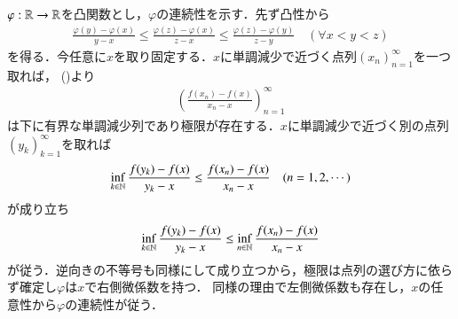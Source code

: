 	\begin{prf}
		$\varphi:\mathbb{R} \rightarrow \mathbb{R}$を凸関数とし，$\varphi$の連続性を示す．先ず凸性から
		\begin{align}
			\frac{\varphi(y) - \varphi(x)}{y - x} 
			\leq \frac{\varphi(z) - \varphi(x)}{z - x}
			\leq \frac{\varphi(z) - \varphi(y)}{z - y}
			\quad (\forall x < y < z)
			\label{ineq:lem:convex_function_measurability_1}
		\end{align}
		を得る．今任意に$x$を取り固定する．$x$に単調減少で近づく点列$(x_n)_{n=1}^{\infty}$を一つ取れば，
		()より
		 \begin{align}
		 	\left(\frac{f(x_n)-f(x)}{x_n-x}\right)_{n=1}^{\infty} 
		 	\label{seq:lem:convex_function_measurability_2}
		 \end{align}
		 は下に有界な単調減少列であり極限が存在する．$x$に単調減少で近づく別の点列$(y_k)_{k=1}^{\infty}$を取れば
		 \begin{align}
		 	\operatorname*{inf}_{k \in \mathbb{N}} \frac{f(y_k)-f(x)}{y_k-x} \leq \frac{f(x_n)-f(x)}{x_n-x} \quad (n=1,2,\cdots)
		 \end{align}
		 が成り立ち
		 \begin{align}
		 	\operatorname*{inf}_{k \in \mathbb{N}} \frac{f(y_k)-f(x)}{y_k-x} \leq \operatorname*{inf}_{n \in \mathbb{N}} \frac{f(x_n)-f(x)}{x_n-x}
		 \end{align}
		 が従う．逆向きの不等号も同様にして成り立つから，極限は点列の選び方に依らず確定し$\varphi$は$x$で右側微係数を持つ．
		 同様の理由で左側微係数も存在し，$x$の任意性から$\varphi$の連続性が従う．
		 \QED
	\end{prf}
	

